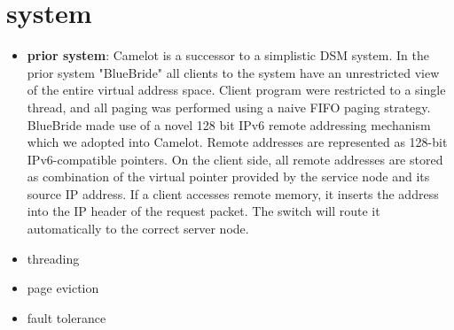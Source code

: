 \section{system}
\label{sec:system}

\begin{itemize}

    \item \textbf{prior system}: Camelot is a successor to a
simplistic DSM system. In the prior system "BlueBride" all clients to the
system have an unrestricted view of the entire virtual address space.
Client program were restricted to a single thread, and all paging was
performed using a naive FIFO paging strategy. BlueBride made use of a
novel 128 bit IPv6 remote addressing mechanism which we adopted into
Camelot. Remote addresses are represented as 128-bit IPv6-compatible
pointers. On the client side, all remote addresses are stored as
combination of the virtual pointer provided by the service node and
its source IP address. If a client accesses remote memory, it inserts
the address into the IP header of the request packet. The switch will
route it automatically to the correct server node. \\

    \item threading \\
    \item page eviction \\
    \item fault tolerance
\end{itemize}
